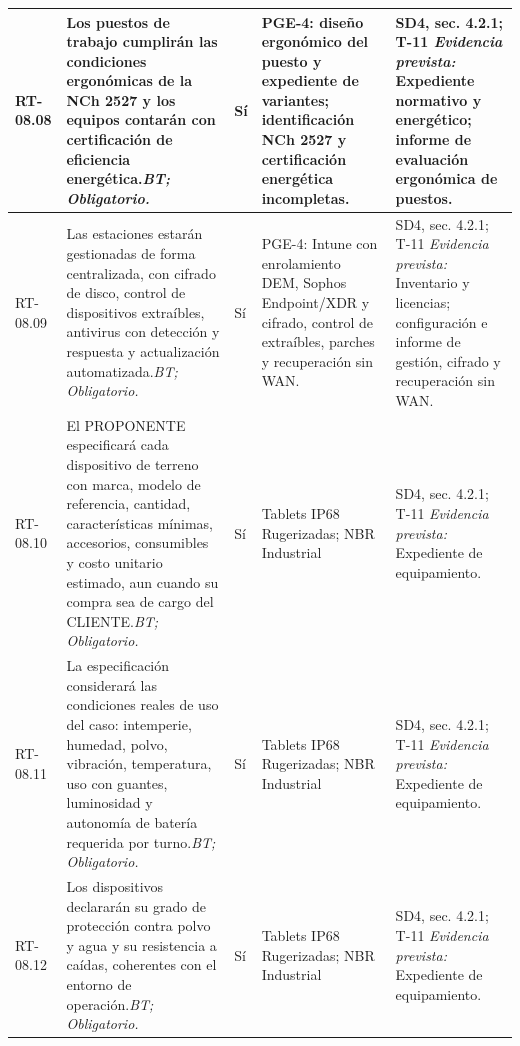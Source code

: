 \begin{paginaHorizontalSynaptix}
\begin{longtable}{|L{0.09\AnchoMatrizTDoce}|L{0.385\AnchoMatrizTDoce}|L{0.065\AnchoMatrizTDoce}|L{0.18\AnchoMatrizTDoce}|L{0.28\AnchoMatrizTDoce}|}
RT-\allowbreak{}08.\allowbreak{}08 &
Los puestos de trabajo cumplirán las condiciones ergonómicas de la NCh 2527 y los equipos contarán con certificación de eficiencia energética.\newline\textit{BT; Obligatorio.} &
Sí &
PGE-4: diseño ergonómico del puesto y expediente de variantes; identificación NCh 2527 y certificación energética incompletas. &
SD4, sec. 4.2.1; T-11 \newline\textit{Evidencia prevista:} Expediente normativo y energético; informe de evaluación ergonómica de puestos. \\ \hline

RT-\allowbreak{}08.\allowbreak{}09 &
Las estaciones estarán gestionadas de forma centralizada, con cifrado de disco, control de dispositivos extraíbles, antivirus con detección y respuesta y actualización automatizada.\newline\textit{BT; Obligatorio.} &
Sí &
PGE-4: Intune con enrolamiento DEM, Sophos Endpoint/\allowbreak{}XDR y cifrado, control de extraíbles, parches y recuperación sin WAN. &
SD4, sec. 4.2.1; T-11 \newline\textit{Evidencia prevista:} Inventario y licencias; configuración e informe de gestión, cifrado y recuperación sin WAN. \\ \hline

RT-\allowbreak{}08.\allowbreak{}10 &
El PROPONENTE especificará cada dispositivo de terreno con marca, modelo de referencia, cantidad, características mínimas, accesorios, consumibles y costo unitario estimado, aun cuando su compra sea de cargo del CLIENTE.\newline\textit{BT; Obligatorio.} &
Sí &
Tablets IP68 Rugerizadas; NBR Industrial &
SD4, sec. 4.2.1; T-11 \newline\textit{Evidencia prevista:} Expediente de equipamiento. \\ \hline

RT-\allowbreak{}08.\allowbreak{}11 &
La especificación considerará las condiciones reales de uso del caso: intemperie, humedad, polvo, vibración, temperatura, uso con guantes, luminosidad y autonomía de batería requerida por turno.\newline\textit{BT; Obligatorio.} &
Sí &
Tablets IP68 Rugerizadas; NBR Industrial &
SD4, sec. 4.2.1; T-11 \newline\textit{Evidencia prevista:} Expediente de equipamiento. \\ \hline

RT-\allowbreak{}08.\allowbreak{}12 &
Los dispositivos declararán su grado de protección contra polvo y agua y su resistencia a caídas, coherentes con el entorno de operación.\newline\textit{BT; Obligatorio.} &
Sí &
Tablets IP68 Rugerizadas; NBR Industrial &
SD4, sec. 4.2.1; T-11 \newline\textit{Evidencia prevista:} Expediente de equipamiento. \\ \hline


\end{longtable}
\end{paginaHorizontalSynaptix}
